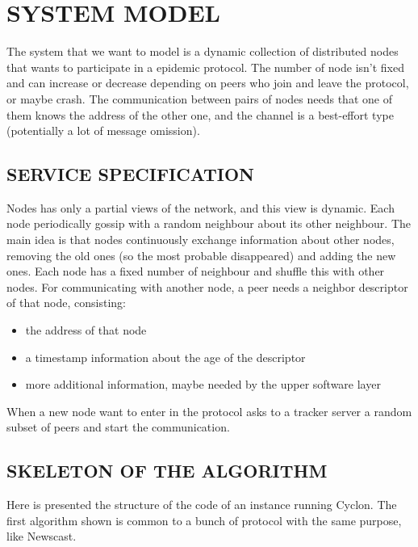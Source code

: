\documentclass[a4paper,12pt,notitlepage]{article} %
\begin{document}
\section{SYSTEM MODEL}

The system that we want to model is a dynamic collection of distributed nodes that wants to participate in
 a epidemic protocol. The number of node isn't fixed and can increase or decrease depending on peers who
 join and leave the protocol, or maybe crash. 
 The communication between pairs of nodes needs that one 
 of them knows the address of the other one, and the channel is a best-effort type (potentially a lot of 
 message omission). 


\subsection{SERVICE SPECIFICATION}

Nodes has only a partial views of the network, and this view is dynamic. Each node periodically 
 gossip with a random neighbour about its other neighbour. The main idea is that nodes continuously
 exchange information about other nodes, removing the old ones (so the most probable disappeared) and
 adding the new ones. Each node has a fixed number of neighbour and shuffle this with other nodes.
 For communicating with another node, a peer needs a neighbor descriptor of that node, consisting:

 \begin{itemize}
 	\item the address of that node
 	\item a timestamp information about the age of the descriptor
 	\item more additional information, maybe needed by the upper software layer\cite{slideMontre}
 \end{itemize}

When a new node want to enter in the protocol asks to a tracker 
 server a random subset of peers and start the communication.

 \subsection{SKELETON OF THE ALGORITHM}	
Here is presented the structure of the code of an instance running Cyclon. The first algorithm shown 
 is common to a bunch of protocol with the same purpose, like Newscast\cite{newscast}.
\end{document}

